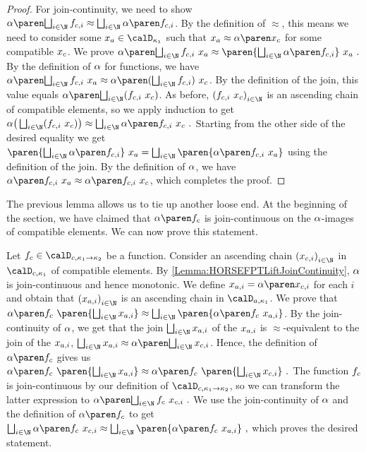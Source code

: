 \documentclass[../../diss.tex]{subfiles}
\begin{document}
\begin{proof}
    For join-continuity, we need to show
    \(
        \abs { \bigsqcup_{i \in \N} \fci }
        \approx
        \bigsqcup_{i \in \N} \abs {\fci }
    \).
    By the definition of $\approx$, this means we need to consider some $\xa \in \domain{\kappa_1}$ such that $\xa \approx \abs{\xc}$ for some compatible $x_c$.
    We prove
    \(
        \abs { \bigsqcup_{i \in \N} \fci } \appl \xa
        \approx
        \paren{\bigsqcup_{i \in \N} \abs {\fci }} \appl \xa
        \ .
    \)
    By the definition of $\abs$ for functions, we have
    $\abs { \bigsqcup_{i \in \N} \fci } \appl \xa \approx \abs{ ( \bigsqcup_{i \in \N} \fci ) \appl \xc  }$.
    By the definition of the join, this value equals
    $\abs{ \bigsqcup_{i \in \N} (\fci \appl \xc)  }$.
    As before, ${(\fci \appl \xc)}_{i \in \N}$ is an ascending chain of compatible elements, so we apply induction to get
    \(
        \abs \big( \bigsqcup_{i \in \N} (\fci \appl \xc)  \big)
        \approx
        \bigsqcup_{i \in \N} \abs{ \fci \appl \xc }
        \ .
    \)
    Starting from the other side of the desired equality we get
    \(
        \paren{\bigsqcup_{i \in \N} \abs {\fci }} \appl \xa
        =
        \bigsqcup_{i \in \N} \paren{ \abs {\fci } \appl \xa}
    \) using the definition of the join.
    By the definition of $\abs$, we have $\abs {\fci } \appl \xa \approx \abs{ \fci \appl \xc }$, which completes the proof.
\end{proof}

The previous lemma allows us to tie up another loose end.
At the beginning of the section, we have claimed that $\abs{\fc}$ is join-continuous on the $\abs$-images of compatible elements.
We can now prove this statement.

Let $\fc \in \domainc{\kappa_1 \to \kappa_2}$ be a function.
Consider an ascending chain ${(\xci)}_{i \in \N}$ in $\domainc{\kappa_1}$ of compatible elements.
By \cref{Lemma:HORSEFPTLiftJoinContinuity}, $\abs$ is join-continuous and hence monotonic.
We define $\xai = \abs{\xci}$ for each $i$ and obtain that ${(\xai)}_{i \in \N}$ is an ascending chain in $\domaina{\kappa_1}$.
We prove that $\abs{\fc} \appl \paren{\bigsqcup_{i \in \N} \xai} \approx \bigsqcup_{i \in \N} \paren{ \abs{\fc} \appl \xai}$.
By the join-continuity of $\abs$, we get that the join $\bigsqcup_{i \in \N} \xai$ of the $x_{a,i}$ is $\approx$-equivalent to the join of the $x_{a,i}$, $\bigsqcup_{i \in \N} \xai \approx \abs{\bigsqcup_{i \in \N} \xci}$.
Hence, the definition of $\abs{\fc}$ gives us
\(
    \abs{\fc} \appl \paren{\bigsqcup_{i \in \N} \xai}
    \approx
    \abs{\fc \appl \paren{\bigsqcup_{i \in \N} \xci}}
    \ .
\)
The function $f_c$ is join-continuous by our definition of $\domainc{\kappa_1 \to \kappa_2}$, so we can transform the latter expression to
\(
    \abs{\bigsqcup_{i \in \N} \fc \appl \xci}
    \ .
\)
We use the join-continuity of $\abs$ and the definition of $\abs{\fc}$ to get
\(
    \bigsqcup_{i \in \N} \abs{\fc \appl \xci}
    \approx
    \bigsqcup_{i \in \N} \paren{\abs{\fc} \appl \xai}
    \ ,
\)
which proves the desired statement.
\end{document}
